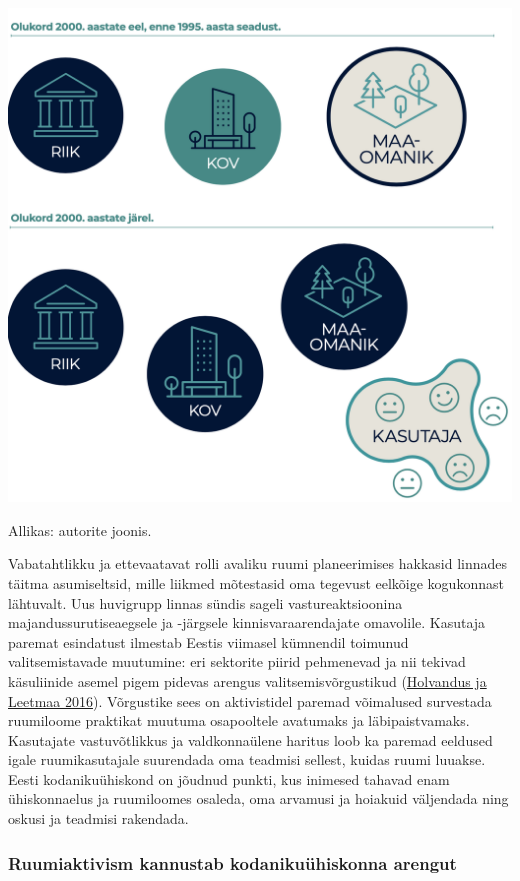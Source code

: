 \documentclass[estonian,]{article}
\begin{document}
\begin{center}\includegraphics[width=0.8\linewidth]{figures/2-chapter/fig231} \end{center}

\begin{imgsource}
{Allikas:} autorite joonis.
\end{imgsource}

Vabatahtlikku ja ettevaatavat rolli avaliku ruumi planeerimises hakkasid linnades täitma asumiseltsid, mille liikmed mõtestasid oma tegevust eelkõige kogukonnast lähtuvalt. Uus huvigrupp linnas sündis sageli vastureaktsioonina majandussurutiseaegsele ja -järgsele kinnisvaraarendajate omavolile.
Kasutaja paremat esindatust ilmestab Eestis viimasel kümnendil toimunud valitsemistavade muutumine: eri sektorite piirid pehmenevad ja nii tekivad käsuliinide asemel pigem pidevas arengus valitsemisvõrgustikud (\protect\hyperlink{Holvandus2016}{Holvandus ja Leetmaa 2016}). Võrgustike sees on aktivistidel paremad võimalused survestada ruumiloome praktikat muutuma osapooltele avatumaks ja läbipaistvamaks. Kasutajate vastuvõtlikkus ja valdkonnaülene haritus loob ka paremad eeldused igale ruumikasutajale suurendada oma teadmisi sellest, kuidas ruumi luuakse. Eesti kodanikuühiskond on jõudnud punkti, kus inimesed tahavad enam ühiskonnaelus ja ruumiloomes osaleda, oma arvamusi ja hoiakuid väljendada ning oskusi ja teadmisi rakendada.

\hypertarget{ruumiaktivism-kannustab-kodanikuuxfchiskonna-arengut}{%
\subsubsection*{Ruumiaktivism kannustab kodanikuühiskonna arengut}\label{ruumiaktivism-kannustab-kodanikuuxfchiskonna-arengut}}
\end{document}
